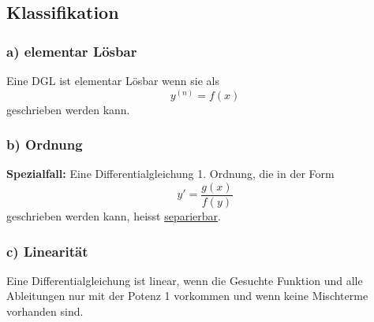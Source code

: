 \subsection{Klassifikation}
\subsubsection*{a) elementar Lösbar}
Eine DGL ist elementar Lösbar wenn sie als 
\begin{equation*}
    y^{\left( n \right)} = f(x)
\end{equation*}
geschrieben werden kann.

\subsubsection*{b) Ordnung}

\textbf{Spezialfall:} Eine Differentialgleichung 1. Ordnung, die in der Form 
\begin{equation*}
    y' = \frac{g(x)}{f(y)}
\end{equation*}
geschrieben werden kann, heisst \underline{separierbar}.

\subsubsection*{c) Linearität}
Eine Differentialgleichung ist linear, wenn die Gesuchte Funktion und alle
Ableitungen nur mit der Potenz 1 vorkommen und wenn keine Mischterme vorhanden sind.

